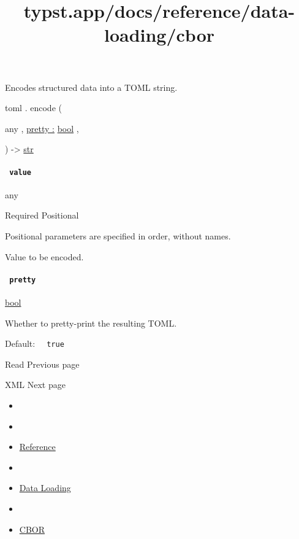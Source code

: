 Encodes structured data into a TOML string.

toml { . } { encode } (

{ { any } , } { \hyperref[definitions-encode-parameters-pretty]{pretty
:} \href{/docs/reference/foundations/bool/}{bool} , }

) -\textgreater{} \href{/docs/reference/foundations/str/}{str}

\paragraph{\texorpdfstring{\texttt{\ value\ }}{ value }}\label{definitions-encode-value}

{ any }

{Required} {{ Positional }}

\label{definitions-encode-value-positional-tooltip}
Positional parameters are specified in order, without names.

Value to be encoded.

\paragraph{\texorpdfstring{\texttt{\ pretty\ }}{ pretty }}\label{definitions-encode-pretty}

\href{/docs/reference/foundations/bool/}{bool}

Whether to pretty-print the resulting TOML.

Default: \texttt{\ }{\texttt{\ true\ }}\texttt{\ }

\href{/docs/reference/data-loading/read/}{\pandocbounded{}}

{ Read } { Previous page }

\href{/docs/reference/data-loading/xml/}{\pandocbounded{}}

{ XML } { Next page }


\title{typst.app/docs/reference/data-loading/cbor}

\begin{itemize}
\tightlist
\item
  \href{/docs}{}
\item
  
\item
  \href{/docs/reference/}{Reference}
\item
  
\item
  \href{/docs/reference/data-loading/}{Data Loading}
\item
  
\item
  \href{/docs/reference/data-loading/cbor/}{CBOR}
\end{itemize}

